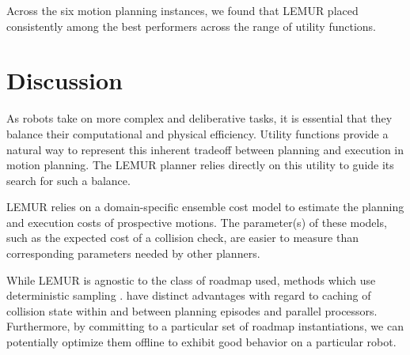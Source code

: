 Across the six motion planning instances,
we found that LEMUR placed consistently among the best performers
across the range of utility functions.

\section{Discussion}
\label{sec:discussion}

As robots take on more complex and deliberative tasks,
it is essential that they balance their computational and
physical efficiency.
Utility functions provide a natural way to represent this
inherent tradeoff between planning and execution
in motion planning.
The LEMUR planner relies directly on this utility
to guide its search for such a balance.

LEMUR relies on a domain-specific ensemble cost model to
estimate the planning and execution costs of prospective motions.
The parameter(s) of these models,
such as the expected cost of a collision check,
are easier to measure than corresponding parameters needed by
other planners.


While LEMUR is agnostic to the class of roadmap used,
methods which use deterministic sampling
\citep{lavalle2004deterministic, janson2015deterministicsampling}.
have distinct advantages with regard to caching of collision state
within and between planning episodes and parallel processors.
Furthermore,
by committing to a particular set of roadmap instantiations,
we can potentially optimize them offline \citep{salzman2014sparsification}
to exhibit good behavior on a particular robot.



